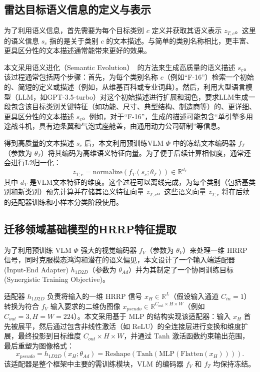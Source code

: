 \subsection{雷达目标语义信息的定义与表示}
\label{subsec:semantic_representation}

为了利用语义信息，首先需要为每个目标类别 $c$ 定义并获取其语义表示 $z_{T,c}$。这里的语义信息 $s_c$ 指的是关于类别 $c$ 的文本描述。与简单的类别名称相比，更丰富、更具区分性的文本描述通常能带来更好的效果。

本文采用语义进化（Semantic Evolution）~\cite{SemFew}的方法来生成高质量的语义描述 $s_c$。该过程通常包括两个步骤：首先，为每个类别名称 $c$（例如“F-16”）检索一个初始的、简短的定义或描述（例如，从维基百科或专业词典）。然后，利用大型语言模型（LLM，如GPT-3.5-turbo）对这个初始描述进行扩展和润色，要求LLM生成一段包含该目标类别关键特征（如功能、尺寸、典型结构、制造商等）的、更详细、更具区分性的文本描述 $s_c$。例如，对于“F-16”，生成的描述可能包含“单引擎多用途战斗机，具有边条翼和气泡式座舱盖，由通用动力公司研制”等信息。

得到高质量的文本描述 $s_c$ 后，本文利用预训练VLM $\Phi$ 中的冻结文本编码器 $f_T$（参数为 $\theta_T$）将其编码为高维语义特征向量。为了便于后续计算相似度，通常还会进行L2归一化：
\begin{equation}
    z_{T,c} = \text{normalize}(f_T(s_c; \theta_T)) \in \mathbb{R}^{d_T}
    \label{eq:semantic_encoding}
\end{equation}
其中 $d_T$ 是VLM文本特征的维度。这个过程可以离线完成，为每个类别（包括基类别和新类别）预先计算并存储其语义特征向量 $z_{T,c}$。这些语义向量 $z_{T,c}$ 将在后续的适配器训练和小样本分类阶段使用。

\subsection{迁移领域基础模型的HRRP特征提取}
\label{subsec:hrrp_feature_vlm}

为了利用预训练 VLM $\Phi$ 强大的视觉编码器 $f_V$（参数为 $\theta_V$）来处理一维 HRRP 信号，同时克服模态鸿沟和潜在的语义偏见，本文设计了一个输入端适配器 (Input-End Adapter) $h_{1D2D}$（参数为 $\theta_{Ad}$）并为其制定了一个协同训练目标 (Synergistic Training Objective)。 

适配器 $h_{1D2D}$ 负责将输入的一维 HRRP 信号 $x_H \in \mathbb{R}^{L}$（假设输入通道 $C_{in}=1$）转换为符合 $f_V$ 输入要求的二维伪图像 $x_{pseudo} \in \mathbb{R}^{C_{out} \times H \times W}$（例如 $C_{out}=3, H=W=224$）。本文采用基于 MLP 的结构实现该适配器：输入 $x_H$ 首先被展平，然后通过包含非线性激活（如 ReLU）的全连接层进行变换和维度扩展，最终投影到目标维度 $C_{out} \times H \times W$，并通过 Tanh 激活函数约束输出范围，最后重塑为图像格式： 
\begin{equation} x_{pseudo} = h_{1D2D}(x_H; \theta_{Ad}) = \text{Reshape}(\text{Tanh}(\text{MLP}(\text{Flatten}(x_H)))). \label{eq:adapter_1d2d} \end{equation} 
该适配器是整个框架中主要的需训练模块，VLM 的编码器 $f_V$ 和 $f_T$ 均保持冻结。 

